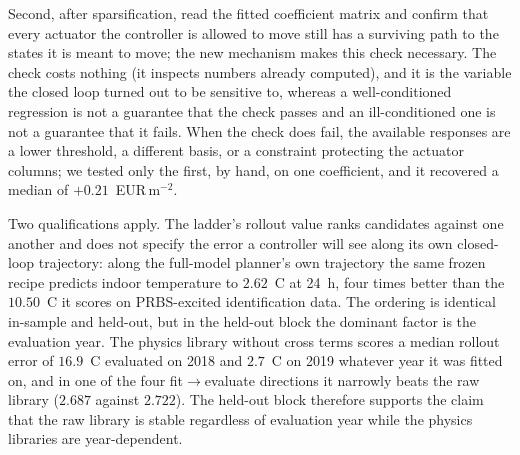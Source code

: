 Second, after sparsification, read the fitted coefficient matrix and confirm that
every actuator the controller is allowed to move still has a surviving path to the
states it is meant to move; the new mechanism makes this check necessary. The check
costs nothing (it inspects numbers already computed), and it is the variable the
closed loop turned out to be sensitive to, whereas a well-conditioned regression is not a guarantee
that the check passes and an ill-conditioned one is not a guarantee that it fails.
When the check does fail, the available responses are a lower threshold, a
different basis, or a constraint protecting the actuator columns; we tested only
the first, by hand, on one coefficient, and it recovered a median of
$+0.21$~EUR\,m$^{-2}$.

Two qualifications apply. The ladder's rollout value ranks candidates against one
another and does not specify the error a controller will see along its own closed-loop
trajectory: along the full-model planner's own trajectory the same frozen recipe
predicts indoor temperature to $2.62$~\textdegree C at 24~h, four times better than
the $10.50$~\textdegree C it scores on PRBS-excited identification data.
The ordering is identical in-sample and held-out, but in the held-out block the
dominant factor is the evaluation year. The physics library without cross terms
scores a median rollout error of $16.9$~\textdegree C evaluated on 2018 and
$2.7$~\textdegree C on 2019 whatever year it was fitted on, and in one of
the four fit$\rightarrow$evaluate directions it narrowly beats the raw library
($2.687$ against $2.722$). The held-out block therefore supports the claim that the raw
library is stable regardless of evaluation year while the physics libraries are
year-dependent.


